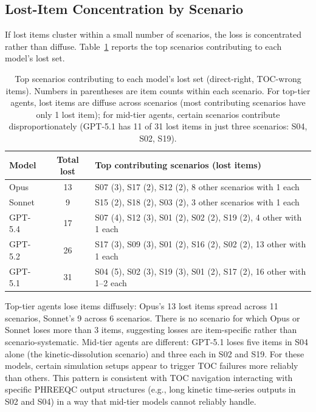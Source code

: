 \documentclass{article}
\begin{document}
\subsection{Lost-Item Concentration by Scenario}

If lost items cluster within a small number of scenarios, the loss is concentrated rather than diffuse. Table~\ref{tab:appendix-lost-by-scenario} reports the top scenarios contributing to each model's lost set.

\begin{table}[h]
\centering
\small
\setlength{\tabcolsep}{4pt}
\begin{tabular}{lcl}
\toprule
Model & Total lost & Top contributing scenarios (lost items) \\
\midrule
Opus & 13 & S07 (3), S17 (2), S12 (2), 8 other scenarios with 1 each \\
Sonnet & 9 & S15 (2), S18 (2), S03 (2), 3 other scenarios with 1 each \\
GPT-5.4 & 17 & S07 (4), S12 (3), S01 (2), S02 (2), S19 (2), 4 other with 1 each \\
GPT-5.2 & 26 & S17 (3), S09 (3), S01 (2), S16 (2), S02 (2), 13 other with 1 each \\
GPT-5.1 & 31 & S04 (5), S02 (3), S19 (3), S01 (2), S17 (2), 16 other with 1--2 each \\
\bottomrule
\end{tabular}
\caption{Top scenarios contributing to each model's lost set (direct-right, TOC-wrong items). Numbers in parentheses are item counts within each scenario. For top-tier agents, lost items are diffuse across scenarios (most contributing scenarios have only 1 lost item); for mid-tier agents, certain scenarios contribute disproportionately (GPT-5.1 has 11 of 31 lost items in just three scenarios: S04, S02, S19).}
\label{tab:appendix-lost-by-scenario}
\end{table}

Top-tier agents lose items diffusely: Opus's 13 lost items spread across 11 scenarios, Sonnet's 9 across 6 scenarios. There is no scenario for which Opus or Sonnet loses more than 3 items, suggesting losses are item-specific rather than scenario-systematic. Mid-tier agents are different: GPT-5.1 loses five items in S04 alone (the kinetic-dissolution scenario) and three each in S02 and S19. For these models, certain simulation setups appear to trigger TOC failures more reliably than others. This pattern is consistent with TOC navigation interacting with specific PHREEQC output structures (e.g., long kinetic time-series outputs in S02 and S04) in a way that mid-tier models cannot reliably handle.
\end{document}
